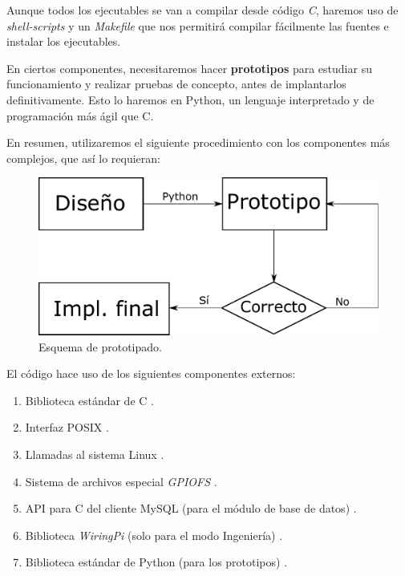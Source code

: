 Aunque todos los ejecutables se van a compilar desde código \textit{C}, haremos uso de \textit{shell-scripts} y un \textit{Makefile} que nos permitirá compilar fácilmente las fuentes e instalar los ejecutables.

En ciertos componentes, necesitaremos hacer \textbf{prototipos} para estudiar su funcionamiento y realizar pruebas de concepto, antes de implantarlos definitivamente. Esto lo haremos en Python, un lenguaje interpretado y de programación más ágil que C.

En resumen, utilizaremos el siguiente procedimiento con los componentes más complejos, que así lo requieran:

\smallskip

\begin{figure}[H]
	\noindent \begin{centering}
		\includegraphics[width=\linewidth/2]{capitulo5/prototipado}
		\par\end{centering}
	\smallskip
	\caption{\label{fig:prototipado} Esquema de prototipado.}
\end{figure} 

\smallskip

El código hace uso de los siguientes componentes externos:

\begin{enumerate}
	\item Biblioteca estándar de C \cite{cplusplus}.
	\item Interfaz \acrshort{POSIX} \cite{wiki_posix}.
	\item Llamadas al sistema Linux \cite{manpages}.
	\item Sistema de archivos especial \textit{GPIOFS} \cite{gpiofs}.
	\item \acrshort{API} para C del cliente MySQL (para el módulo de base de datos) \cite{mysql}.
	\item Biblioteca \textit{WiringPi} (solo para el modo Ingeniería) \cite{wiringpi}.
	\item Biblioteca estándar de Python (para los prototipos) \cite{python}.
\end{enumerate}

